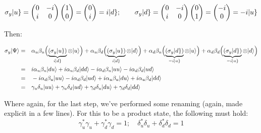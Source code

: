 \documentclass[solutions.tex]{subfiles}
\begin{document}
\[
	\sigma_y|u\} = \begin{pmatrix}
		0 & -i \\
		i & 0 \\
	\end{pmatrix}\begin{pmatrix} 1 \\ 0 \\ \end{pmatrix} = \begin{pmatrix}
		0 \\ i \\
	\end{pmatrix} = i|d\};\qquad\sigma_y|d\} = \begin{pmatrix}
		0 & -i \\
		i & 0 \\
	\end{pmatrix}\begin{pmatrix} 0 \\ 1 \\ \end{pmatrix} = \begin{pmatrix}
		-i \\ 0 \\
	\end{pmatrix} = -i|u\}
\]

Then:

\begin{equation*}\begin{aligned}
	\sigma_y|\Psi\rangle &=&&
		  \alpha_u\beta_u\Bigl(\underbrace{(\sigma_y|u\})}_{i|d\}}\otimes|u\rangle\Bigr)
		+ \alpha_u\beta_d\Bigl(\underbrace{(\sigma_y|u\})}_{i|d\}}\otimes|d\rangle\Bigr)
		+ \alpha_d\beta_u\Bigl(\underbrace{(\sigma_y|d\})}_{-i|u\}}\otimes|u\rangle\Bigr)
		+ \alpha_d\beta_d\Bigl(\underbrace{(\sigma_y|d\})}_{-i|u\}}\otimes|d\rangle\Bigr) \\
	~ &=&& i\alpha_u\beta_u|du\rangle+ i\alpha_u\beta_d|dd\rangle
		-i\alpha_d\beta_u|uu\rangle -i\alpha_d\beta_d|ud\rangle \\
	~ &=&& -i\alpha_d\beta_u|uu\rangle -i\alpha_d\beta_d|ud\rangle
		+ i\alpha_u\beta_u|du\rangle+ i\alpha_u\beta_d|dd\rangle \\
	&=&& \gamma_u\delta_u|uu\rangle + \gamma_u\delta_d|ud\rangle
		+\gamma_d\delta_u|du\rangle+ \gamma_d\delta_d|dd\rangle \\
\end{aligned}\end{equation*}

Where again, for the last step, we've performed some renaming (again, made
explicit in a few lines). For this
to be a product state, the following must hold:
\[
	\gamma_u^*\gamma_u + \gamma_d^*\gamma_d = 1;\quad
	\delta_u^*\delta_u + \delta_d^*\delta_d = 1
\]
\end{document}

